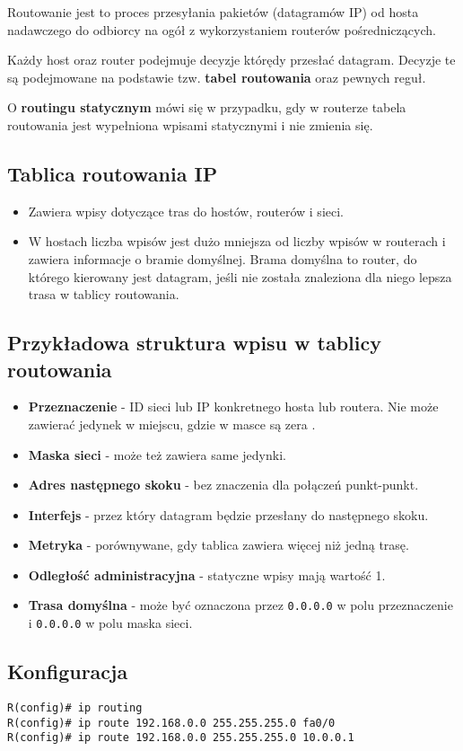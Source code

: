 \documentclass[../sk-egzamin.tex]{subfiles}
\begin{document}

Routowanie jest to proces przesyłania pakietów (datagramów IP) od hosta
nadawczego do odbiorcy na ogół z wykorzystaniem routerów pośredniczących.

Każdy host oraz router podejmuje decyzje którędy przesłać datagram.
Decyzje te są podejmowane na podstawie tzw. \textbf{tabel routowania} oraz
pewnych reguł.

O \textbf{routingu statycznym} mówi się w przypadku, gdy w routerze tabela
routowania jest wypełniona wpisami statycznymi i nie zmienia się.

\subsection*{Tablica routowania IP}
\begin{itemize}
    \item Zawiera wpisy dotyczące tras do hostów, routerów i sieci.
    \item W hostach liczba wpisów jest dużo mniejsza od liczby wpisów w
    routerach i zawiera informacje o bramie domyślnej.
    Brama domyślna to router, do którego kierowany jest datagram, jeśli nie
    została znaleziona dla niego lepsza trasa w tablicy routowania.
\end{itemize}

\subsection*{Przykładowa struktura wpisu w tablicy routowania}
\begin{itemize}
    \item \textbf{Przeznaczenie} - ID sieci lub IP konkretnego
    hosta lub routera.
    Nie może zawierać jedynek w miejscu, gdzie w masce są zera .
    \item \textbf{Maska sieci} - może też zawiera same jedynki.
    \item \textbf{Adres następnego skoku} - bez znaczenia dla połączeń
    punkt-punkt.
    \item \textbf{Interfejs} - przez który datagram będzie przesłany do
    następnego skoku.
    \item \textbf{Metryka}%
    - porównywane, gdy tablica zawiera więcej niż jedną trasę.
    \item \textbf{Odległość administracyjna} - statyczne wpisy mają wartość 1.
    \item \textbf{Trasa domyślna} - może być oznaczona przez \texttt{0.0.0.0}
    w polu przeznaczenie i \texttt{0.0.0.0} w polu maska sieci.
\end{itemize}

\subsection*{Konfiguracja}

\begin{verbatim}
R(config)# ip routing
R(config)# ip route 192.168.0.0 255.255.255.0 fa0/0
R(config)# ip route 192.168.0.0 255.255.255.0 10.0.0.1
\end{verbatim}

\pagebreak
\end{document}
